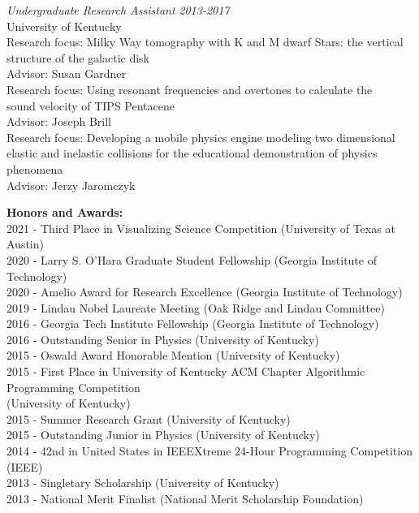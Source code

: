 \documentclass[11pt]{article}
\begin{document}
\begin{flushleft}
  \vspace{8px}
	
  \textit{Undergraduate Research Assistant} \hfill \textit{2013-2017}\\
  University of Kentucky\\
  Research focus: Milky Way tomography with K and M dwarf Stars: the vertical\\ structure of the galactic disk\\ 
  Advisor: Susan Gardner\\
  \vspace{2px}
  Research focus: Using resonant frequencies and overtones to calculate the\\ sound velocity of TIPS Pentacene\\
  Advisor: Joseph Brill\\
  \vspace{2px}
  Research focus: Developing a mobile physics engine modeling two dimensional\\ elastic and inelastic collisions for the educational demonstration of physics phenomena\\
  Advisor: Jerzy Jaromczyk\\
  
  \vspace{8px}
	
  \textbf{Honors and Awards:}\\
  2021 - Third Place in Visualizing Science Competition (University of Texas at Austin)\\
  2020 - Larry S. O'Hara Graduate Student Fellowship (Georgia Institute of Technology)\\
  2020 - Amelio Award for Research Excellence (Georgia Institute of Technology)\\
  2019 - Lindau Nobel Laureate Meeting (Oak Ridge and Lindau Committee)\\
  2016 - Georgia Tech Institute Fellowship (Georgia Institute of Technology)\\
  2016 - Outstanding Senior in Physics (University of Kentucky)\\
  2015 - Oswald Award Honorable Mention (University of Kentucky)\\
  2015 - First Place in University of Kentucky ACM Chapter Algorithmic Programming Competition\\ 
  \hspace{29px} (University of Kentucky)\\
  2015 - Summer Research Grant (University of Kentucky)\\
  2015 - Outstanding Junior in Physics (University of Kentucky)\\
  2014 - 42nd in United States in IEEEXtreme 24-Hour Programming Competition (IEEE)\\
  2013 - Singletary Scholarship (University of Kentucky)\\
  2013 - National Merit Finalist (National Merit Scholarship Foundation)\\


\end{flushleft}
\end{document}
